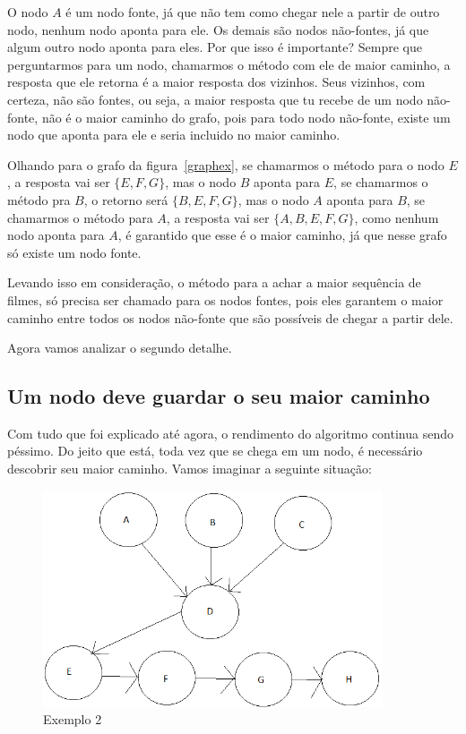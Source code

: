 \documentclass[12pt]{article}
\begin{document}
O nodo $A$ é um nodo fonte, já que não tem como chegar nele a partir de outro
nodo, nenhum nodo aponta para ele. Os demais são nodos não-fontes, já que algum
outro nodo aponta para eles. Por que isso é importante? Sempre que perguntarmos
para um nodo, chamarmos o método com ele de maior caminho, a resposta que ele
retorna é a maior resposta dos vizinhos. Seus vizinhos, com certeza, não são
fontes, ou seja, a maior resposta que tu recebe de um nodo não-fonte, não é o
maior caminho do grafo, pois para todo nodo não-fonte, existe um nodo que aponta
para ele e seria incluido no maior caminho.

Olhando para o grafo da figura~\ref{graphex}, se chamarmos o método para o nodo
$E$, a resposta vai ser $\{E, F, G\}$, mas o nodo $B$ aponta para $E$, se
chamarmos o método pra $B$, o retorno será $\{B, E, F, G\}$, mas o nodo $A$
aponta para $B$, se chamarmos o método para $A$, a resposta vai ser $\{A, B, E,
F, G\}$, como nenhum nodo aponta para $A$, é garantido que esse é o maior
caminho, já que nesse grafo só existe um nodo fonte.

Levando isso em consideração, o método para a achar a maior sequência de filmes,
só precisa ser chamado para os nodos fontes, pois eles garantem o maior caminho
entre todos os nodos não-fonte que são possíveis de chegar a partir dele.

\vspace{0.5cm}

Agora vamos analizar o segundo detalhe.

\subsection{Um nodo deve guardar o seu maior caminho}

Com tudo que foi explicado até agora, o rendimento do algoritmo continua sendo
péssimo. Do jeito que está, toda vez que se chega em um nodo, é necessário
descobrir seu maior caminho. Vamos imaginar a seguinte situação:

\begin{figure}[H]
\centering
\includegraphics[width=100mm]{grafo.png}
\caption{Exemplo 2}
\label{grafo}
\end{figure}
\end{document}

